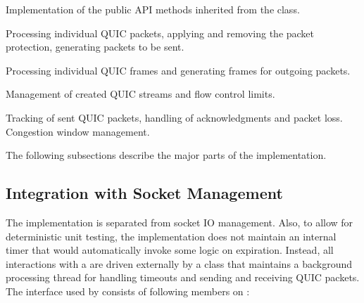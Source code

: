 \begin{itemize}

   Implementation of the public API methods inherited from the
\QuicConnectionProvider{} class.

   Processing individual QUIC packets, applying and removing the packet protection,
generating packets to be sent.

   Processing individual QUIC frames and generating frames for outgoing packets.

   Management of created QUIC streams and flow control limits.

   Tracking of sent QUIC packets, handling of acknowledgments and packet loss.
Congestion window management.

\end{itemize}

The following subsections describe the major parts of the implementation.

\subsection{Integration with Socket Management}

The \ManagedQuicConnection{} implementation is separated from socket IO management. Also, to allow
for deterministic unit testing, the implementation does not maintain an internal timer that would
automatically invoke some logic on expiration. Instead, all interactions with a \Socket{} are driven
externally by a \QuicConnectionContext{} class that maintains a background processing thread for
handling timeouts and sending and receiving QUIC packets. The interface used by
\QuicConnectionContext{} consists of following members on \ManagedQuicConnection{}:

